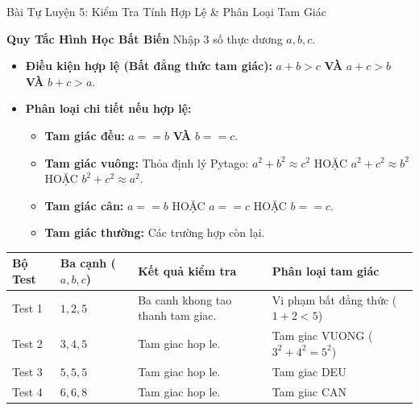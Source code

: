 \documentclass[aspectratio=169, 10pt]{beamer}
\begin{document}
\begin{frame}{Bài Tự Luyện 5: Kiểm Tra Tính Hợp Lệ \& Phân Loại Tam Giác}
  \begin{block}{\textbf{Quy Tắc Hình Học Bất Biến}}
    Nhập 3 số thực dương $a, b, c$.
    \begin{itemize}
      \item \textbf{Điều kiện hợp lệ (Bất đẳng thức tam giác):} $a+b>c$ \textbf{VÀ} $a+c>b$ \textbf{VÀ} $b+c>a$.
      \item \textbf{Phân loại chi tiết nếu hợp lệ:}
        \begin{itemize}
          \item \textbf{Tam giác đều:} $a == b$ \textbf{VÀ} $b == c$.
          \item \textbf{Tam giác vuông:} Thỏa định lý Pytago: $a^2+b^2 \approx c^2$ HOẶC $a^2+c^2 \approx b^2$ HOẶC $b^2+c^2 \approx a^2$.
          \item \textbf{Tam giác cân:} $a == b$ HOẶC $a == c$ HOẶC $b == c$.
          \item \textbf{Tam giác thường:} Các trường hợp còn lại.
        \end{itemize}
    \end{itemize}
  \end{block}
  \begin{table}[h]
    \centering
    \scriptsize
    \begin{tabularx}{0.9\textwidth}{lXXX}
      \toprule
      \textbf{Bộ Test} & \textbf{Ba cạnh ($a, b, c$)} & \textbf{Kết quả kiểm tra} & \textbf{Phân loại tam giác} \\
      \midrule
      Test 1 & $1, 2, 5$ & Ba canh khong tao thanh tam giac. & Vi phạm bất đẳng thức ($1 + 2 < 5$) \\
      \addlinespace
      Test 2 & $3, 4, 5$ & Tam giac hop le. & Tam giac VUONG ($3^2 + 4^2 = 5^2$) \\
      \addlinespace
      Test 3 & $5, 5, 5$ & Tam giac hop le. & Tam giac DEU \\
      \addlinespace
      Test 4 & $6, 6, 8$ & Tam giac hop le. & Tam giac CAN \\
      \bottomrule
    \end{tabularx}
  \end{table}
\end{frame}

\end{document}
